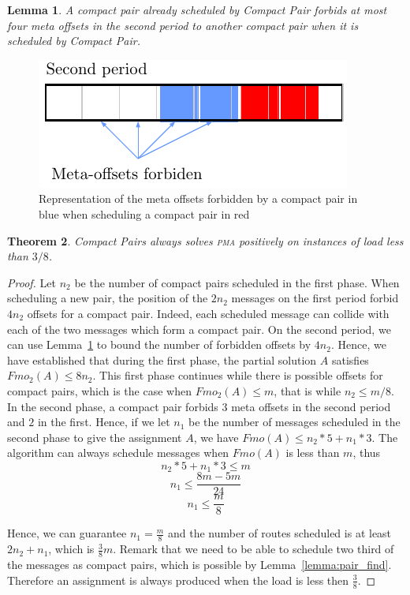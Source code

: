 \documentclass[10pt, conference, letterpaper]{IEEEtran}
\newtheorem{theorem}{Theorem}
\newtheorem{lemma}[theorem]{Lemma}
\newcommand\pma{\textsc{pma}\xspace}
\begin{document}
\begin{lemma}\label{lemma:pair_forbid}
A compact pair already scheduled by Compact Pair forbids at most four meta offsets in the second period to another compact pair when it is scheduled by Compact Pair.
\end{lemma}

\begin{figure}
\begin{center}
\includegraphics[scale=0.7]{pairforbiden}
\end{center}

\caption{Representation of the meta offsets forbidden by a compact pair in blue when scheduling a compact pair in red} 
\label{fig:forbidenmeta}
\end{figure}
\begin{theorem}
Compact Pairs always solves \pma positively on instances of load less than
$3/8$.
\end{theorem}
\begin{proof}
Let $n_2$ be the number of compact pairs scheduled in the first phase. When scheduling a new pair, the position of the $2n_2$ messages on the first period forbid $4n_2$ offsets for a compact pair. Indeed, each scheduled message can collide
with each of the two messages which form a compact pair. On the second period, we can use Lemma~\ref{lemma:pair_forbid} to bound the number of forbidden offsets by $4n_2$. 
Hence, we have established that during the first phase, the partial solution $A$
satisfies $Fmo_2(A) \leq 8n_2$. This first phase continues while there is possible offsets for compact pairs, which is the case when $Fmo_2(A) \leq m$, that is while $n_2 \leq m/8$.
In the second phase, a compact pair forbids $3$ meta offsets in the 
second period and $2$ in the first. Hence, if we let $n_1$ be the number of messages scheduled in the second phase to give the assignment $A$, we have $Fmo(A) \leq n_2*5 + n_1*3$. 
The algorithm can always schedule messages when $Fmo(A)$ is less than $m$, thus
$$ n_2*5 + n_1*3 \leq m$$
$$ n_1 \leq \frac{8m - 5m }{24}$$
$$n_1 \leq \frac{m}{8}$$

Hence, we can guarantee $n_1 = \frac{m}{8}$ and the number of routes scheduled is at least $2n_2 + n_1$,
which is $\frac{3}{8}m$. Remark that we need to be able to schedule two third of the messages as compact pairs, which is possible by Lemma~\ref{lemma:pair_find}. Therefore an assignment is always produced when the load is less then $\frac{3}{8}$.
\end{proof}
\end{document}
